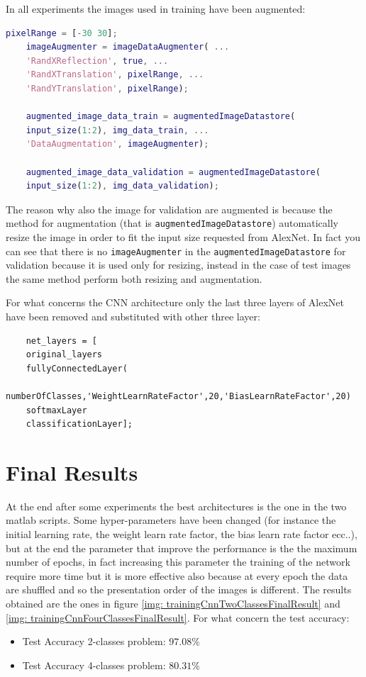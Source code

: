 \documentclass[a4paper]{report}
\begin{document}
	\noindent In all experiments the images used in training have been augmented:
	\begin{lstlisting}[language=Matlab]
	pixelRange = [-30 30];
	imageAugmenter = imageDataAugmenter( ...
	'RandXReflection', true, ...
	'RandXTranslation', pixelRange, ...
	'RandYTranslation', pixelRange);
	
	augmented_image_data_train = augmentedImageDatastore(
	input_size(1:2), img_data_train, ...
	'DataAugmentation', imageAugmenter);
	
	augmented_image_data_validation = augmentedImageDatastore(
	input_size(1:2), img_data_validation);
	\end{lstlisting}

	\noindent The reason why also the image for validation are augmented is because the method for augmentation (that is \texttt{augmentedImageDatastore}) automatically resize the image in order to fit the input size requested from AlexNet. In fact you can see that there is no \texttt{imageAugmenter} in the \texttt{augmentedImageDatastore} for validation because it is used only for resizing, instead in the case of test images the same method perform both resizing and augmentation.
	
	\noindent For what concerns the CNN architecture only the last three layers of AlexNet have been removed and substituted with other three layer:
	
	\begin{lstlisting}
	net_layers = [
	original_layers
	fullyConnectedLayer(
		numberOfClasses,'WeightLearnRateFactor',20,'BiasLearnRateFactor',20)
	softmaxLayer
	classificationLayer]; 
	\end{lstlisting}

	\section{Final Results}
	\noindent At the end after some experiments the best architectures is the one in the two matlab scripts. Some hyper-parameters have been changed (for instance the initial learning rate, the weight learn rate factor, the bias learn rate factor ecc..), but at the end the parameter that improve the performance is the the maximum number of epochs, in fact increasing this parameter the training of the network require more time but it is more effective also because at every epoch the data are shuffled and so the presentation order of the images is different. The results obtained are the ones in figure \ref{img: trainingCnnTwoClassesFinalResult} and \ref{img: trainingCnnFourClassesFinalResult}. For what concern the test accuracy:
	\begin{itemize}
	\item Test Accuracy 2-classes problem: $97.08\%$
	\item Test Accuracy 4-classes problem: $80.31\%$
	\end{itemize}
	
\end{document}
